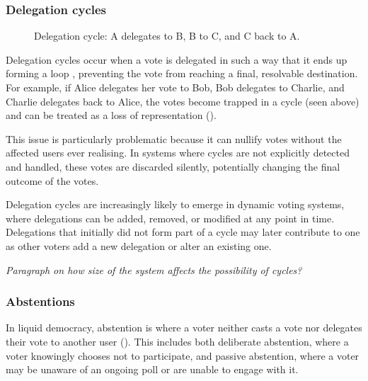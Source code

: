 \subsubsection{Delegation cycles}
\begin{figure}[h]
    \centering
    \caption{Delegation cycle: A delegates to B, B to C, and C back to A.}
    \label{fig:triangle-cycle}
\end{figure}


Delegation cycles occur when a vote is delegated in such a way that it ends up forming a loop \cite{brill_liquid_2022}, preventing the vote from reaching a final, resolvable destination. For example, if Alice delegates her vote to Bob, Bob delegates to Charlie, and Charlie delegates back to Alice, the votes become trapped in a cycle (seen above) and can be treated as a loss of representation (\cite{christoff2017liquiddemocracyanalysisbinary}).

This issue is particularly problematic because it can nullify votes without the affected users ever realising. In systems where cycles are not explicitly detected and handled, these votes are discarded silently, potentially changing the final outcome of the votes.

Delegation cycles are increasingly likely to emerge in dynamic voting systems, where delegations can be added, removed, or modified at any point in time. Delegations that initially did not form part of a cycle may later contribute to one as other voters add a new delegation or alter an existing one.

\textit{Paragraph on how size of the system affects the possibility of cycles?}

\subsubsection{Abstentions}
In liquid democracy, abstention is where a voter neither casts a vote nor delegates their vote to another user (\cite{brill_liquid_2022}). This includes both deliberate abstention, where a voter knowingly chooses not to participate, and passive abstention, where a voter may be unaware of an ongoing poll or are unable to engage with it.

